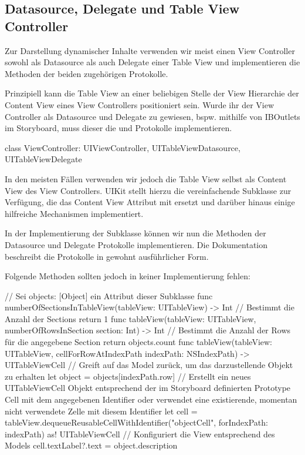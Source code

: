 \documentclass[parskip=half, final]{scrreprt}
\begin{document}
\subsection{Datasource, Delegate und Table View Controller}

Zur Darstellung dynamischer Inhalte verwenden wir meist einen View Controller sowohl als Datasource als auch Delegate einer Table View und implementieren die Methoden der beiden zugehörigen Protokolle.

Prinzipiell kann die Table View an einer beliebigen Stelle der View Hierarchie der Content View eines View Controllers positioniert sein. Wurde ihr der View Controller als Datasource und Delegate zu gewiesen, bspw. mithilfe von IBOutlets im Storyboard, muss dieser die  und  Protokolle implementieren.

\begin{swiftcode}
class ViewController: UIViewController, UITableViewDatasource, UITableViewDelegate
\end{swiftcode}

In den meisten Fällen verwenden wir jedoch die Table View selbst als Content View des View Controllers. UIKit stellt hierzu die vereinfachende Subklasse  zur Verfügung, die das Content View Attribut  mit  ersetzt und darüber hinaus einige hilfreiche Mechanismen implementiert.

In der Implementierung der  Subklasse können wir nun die Methoden der Datasource und Delegate Protokolle implementieren. Die Dokumentation beschreibt die Protokolle in gewohnt ausführlicher Form.

Folgende Methoden sollten jedoch in keiner  Implementierung fehlen:

\begin{swiftcode}
// Sei objects: [Object] ein Attribut dieser Subklasse
func numberOfSectionsInTableView(tableView: UITableView) -> Int {
    // Bestimmt die Anzahl der Sections
    return 1
}
func tableView(tableView: UITableView, numberOfRowsInSection section: Int) -> Int {
    // Bestimmt die Anzahl der Rows für die angegebene Section
    return objects.count
}
func tableView(tableView: UITableView, cellForRowAtIndexPath indexPath: NSIndexPath) -> UITableViewCell {
    // Greift auf das Model zurück, um das darzustellende Objekt zu erhalten
    let object = objects[indexPath.row]
    // Erstellt ein neues UITableViewCell Objekt entsprechend der im Storyboard definierten Prototype Cell mit dem angegebenen Identifier oder verwendet eine existierende, momentan nicht verwendete Zelle mit diesem Identifier
    let cell = tableView.dequeueReusableCellWithIdentifier("objectCell", forIndexPath: indexPath) as! UITableViewCell
    // Konfiguriert die View entsprechend des Models
    cell.textLabel?.text = object.description
}
\end{swiftcode}
\end{document}
